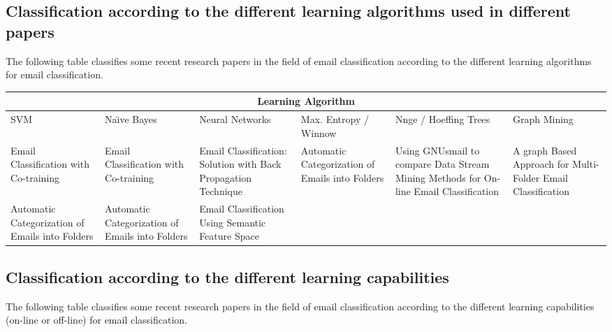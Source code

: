 \subsection{Classification according to the different learning algorithms used in different 
papers}
The following table classifies some recent research papers in the field of email classification according to the different learning algorithms for email classification.
\begin{center}
\begin{tabular}{|p{2cm}|p{2cm}|p{2cm}|p{2cm}|p{2cm}|p{2cm}|}
\hline
\multicolumn{6}{|c|}{Learning Algorithm} \\
\hline
SVM & Na\"{\i}ve Bayes & Neural Networks & Max. Entropy / Winnow & Nnge / Hoeffing Trees & Graph Mining \\ \hline
Email Classification with Co-training \cite{SVETLANA01} &
Email Classification with Co-training \cite{SVETLANA01} &
Email Classification: Solution with Back Propagation Technique \cite{mous05} & 
Automatic Categorization of Emails into Folders \cite{RON04} &
Using GNUsmail to compare Data Stream Mining Methods for On-line Email Classification \cite{JOSE11} &
A graph Based Approach for Multi-Folder Email Classification \cite{sift02} \\ \hline

Automatic Categorization of Emails into Folders \cite{RON04} &
Automatic Categorization of Emails into Folders \cite{RON04} &
Email Classification Using Semantic Feature Space \cite{YUN08} & 
&
& \\ \hline
\end{tabular}
\end{center}
\newpage

\subsection{Classification according to the different learning capabilities}
The following table classifies some recent research papers in the field of email classification according to the different learning capabilities (on-line or off-line) for email classification.

